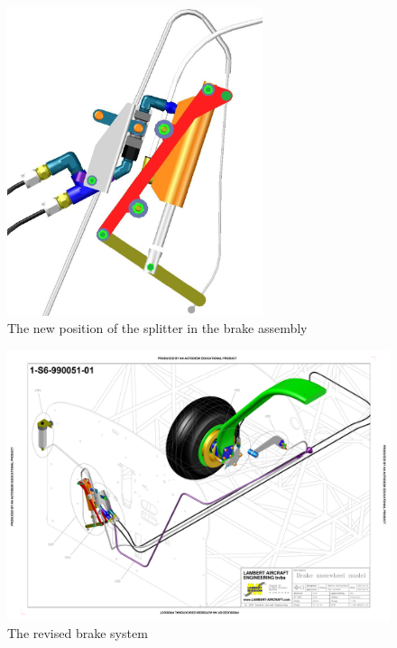 \documentclass[11pt,a4paper]{article}
\begin{document}
\newpage

\begin{figure}[ht!]
	\begin{center}
		\includegraphics[width=7.5cm]{pics/PIC022.jpg}
		\caption{The new position of the splitter in the brake assembly}
		\label{fig:PIC022}
	\end{center}
\end{figure}

\bigskip

\begin{figure}[ht!]
	\begin{center}
		\includegraphics[width=15cm,trim = 1.5cm 2cm 1.5cm 2cm, clip]{pics/PIC023.pdf}
		\caption{The revised brake system}
		\label{fig:PIC023}
	\end{center}
\end{figure}
\end{document}
